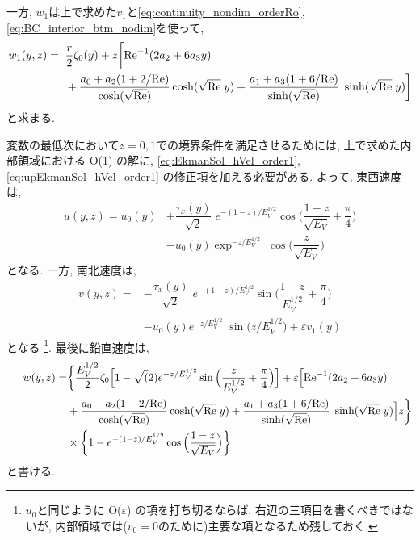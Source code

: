 一方, $w_1$は上で求めた$v_1$と\eqref{eq:continuity_nondim_orderRo}, \eqref{eq:BC_interior_btm_nodim}を使って, 
\begin{equation}
\begin{split}
    w_1(y,z) = \;\;& \dfrac{r}{2} \zeta_0(y) 
       +  z \bigg[  {\rm Re}^{-1} (2a_2 + 6a_3 y) \\ 
       &+ \dfrac{a_0 + a_2(1 + 2/{\rm Re})}{\cosh (\sqrt{\rm Re})} \cosh (\sqrt{\rm Re} \; y)
       + \dfrac{a_1 + a_3(1 + 6/{\rm Re})}{\sinh (\sqrt{\rm Re})} \; \sinh (\sqrt{\rm Re}\; y) 
    \bigg]
\end{split}
\end{equation}
と求まる. 



変数の最低次において$z=0,1$での境界条件を満足させるためには, 
上で求めた内部領域における O(1) の解に, 
\eqref{eq:EkmanSol_hVel_order1}, \eqref{eq:upEkmanSol_hVel_order1} の修正項を加える必要がある. 
よって, 東西速度は,  
\begin{equation}
\begin{split}
    u(y,z) = u_0(y) 
             &+ \dfrac{\tau_x(y)}{\sqrt{2}}\; e^{-(1-z)/E_V^{1/2}} 
                   \cos\Big(\dfrac{1-z}{\sqrt{E_V}} + \dfrac{\pi}{4} \Big) \\
             &- u_0(y)\exp^{-z/E_V^{1/2}} \; \cos \Big( \dfrac{z}{\sqrt{E_V}} \Big)
\end{split}
\end{equation}
となる. 
一方, 南北速度は, 
\begin{equation}
\begin{split}
    v(y,z) = &- \dfrac{\tau_x(y)}{\sqrt{2}} \; e^{-(1-z)/E_V^{1/2}} \sin \Big(\dfrac{1-z}{E_V^{1/2}} + \dfrac{\pi}{4} \Big) \\
             &- u_0(y) e^{-z/E_V^{1/2}} \; \sin \big( z/E_V^{1/2} \big) 
             + \varepsilon v_1(y)
\end{split}
\end{equation}
となる%
\footnote{
$u_0$と同じように O($\varepsilon$) の項を打ち切るならば, 
右辺の三項目を書くべきではないが, 内部領域では($v_0=0$のために)主要な項となるため残しておく. 
}. 
最後に鉛直速度は, 
\begin{equation}
 \begin{split}
   w(y,z) = &\bigg\{
	   \dfrac{E_V^{1/2}}{2}\zeta_0 \Big[ 1 - \sqrt(2) e^{-z/E_V^{1/2}} \sin \Big( \dfrac{z}{E_V^{1/2}} + \dfrac{\pi}{4} \Big)\Big]  
             +  \varepsilon  \Big[ 
             {\rm Re}^{-1} (2a_2 + 6a_3 y) \\
             \;\;\;\;\;\;\;\;\;\;\;\;\;\;\;\;\;\;\;\;
            &+ \dfrac{a_0 + a_2(1 + 2/{\rm Re})}{\cosh (\sqrt{\rm Re})} \cosh (\sqrt{\rm Re} \; y)
             + \dfrac{a_1 + a_3(1 + 6/{\rm Re})}{\sinh (\sqrt{\rm Re})} \; \sinh (\sqrt{\rm Re}\; y) 
            \Big] z
       \bigg\} \\
       &\times \left\{ 1 - e^{ - (1-z)/E_V^{1/2}} \cos \Big( \dfrac{1-z}{\sqrt{E_V}} \Big)  \right\}
 \end{split}
\end{equation}
と書ける. 
